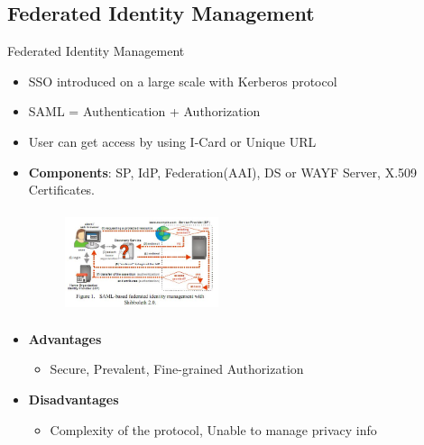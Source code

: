 \documentclass[xcolor=dvipsnames]{beamer}
\begin{document}
\subsection{Federated Identity Management}
\begin{frame}{Federated Identity Management}
\begin{itemize}
\item SSO introduced on a large scale with Kerberos protocol
\item SAML = Authentication + Authorization
\item User can get access by using I-Card or Unique URL
\item \textbf{Components}: SP, IdP, Federation(AAI), DS or WAYF Server, X.509 Certificates.
\begin{figure}
\includegraphics[width=4.5cm,height=3cm]{fidm}
\end{figure}
\item \textbf{Advantages}
\begin{itemize}
	\item Secure, Prevalent, Fine-grained Authorization
\end{itemize}
\item \textbf{Disadvantages}
\begin{itemize}
	\item Complexity of the protocol, Unable to manage privacy info
\end{itemize}
\end{itemize}
\end{frame}
\end{document}
